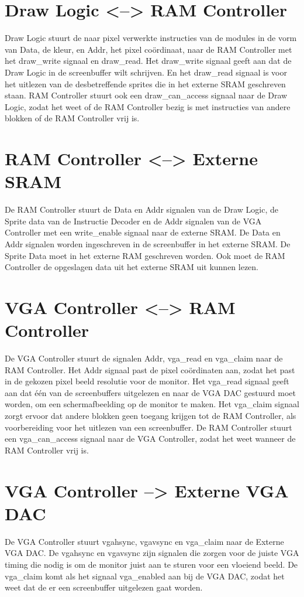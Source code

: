 \documentclass{scrartcl} %
\begin{document}
\section {Draw Logic <--> RAM Controller}
Draw Logic stuurt de naar pixel verwerkte instructies van de modules in de vorm van Data, de kleur, en Addr, het pixel coördinaat, naar de RAM Controller met het draw\_write signaal en draw\_read. Het draw\_write signaal geeft aan dat de Draw Logic in de screenbuffer wilt schrijven. En het draw\_read signaal is voor het uitlezen van de desbetreffende sprites die in het externe SRAM geschreven staan.
RAM Controller stuurt ook een draw\_can\_access signaal naar de Draw Logic, zodat het weet of de RAM Controller bezig is met instructies van andere blokken of de RAM Controller vrij is.

\section{RAM Controller <--> Externe SRAM}
De RAM Controller stuurt de Data en Addr signalen van de Draw Logic, de Sprite data van de Instructie Decoder en de Addr signalen van de VGA Controller met een write\_enable signaal naar de externe SRAM. De Data en Addr signalen worden ingeschreven in de screenbuffer in het externe SRAM. De Sprite Data moet in het externe RAM geschreven worden.
Ook moet de RAM Controller de opgeslagen data uit het externe SRAM uit kunnen lezen.

\section{VGA Controller <--> RAM Controller}
De VGA Controller stuurt de signalen Addr, vga\_read en vga\_claim naar de RAM Controller. Het Addr signaal past de pixel coördinaten aan, zodat het past in de gekozen pixel beeld resolutie voor de monitor. Het vga\_read signaal geeft aan dat één van de screenbuffers uitgelezen en naar de VGA DAC gestuurd moet worden, om een schermafbeelding op de monitor te maken. Het vga\_claim signaal zorgt ervoor dat andere blokken geen toegang krijgen tot de RAM Controller, als voorbereiding voor het uitlezen van een screenbuffer.
De RAM Controller stuurt een vga\_can\_access signaal naar de VGA Controller, zodat het weet wanneer de RAM Controller vrij is.

\section{VGA Controller --> Externe VGA DAC}
De VGA Controller stuurt vgahsync, vgavsync en vga\_claim naar de Externe VGA DAC. De vgahsync en vgavsync zijn signalen die zorgen voor de juiste VGA timing die nodig is om de monitor juist aan te sturen voor een vloeiend beeld. De vga\_claim komt als het signaal vga\_enabled aan bij de VGA DAC, zodat het weet dat de er een screenbuffer uitgelezen gaat worden.
\end{document}
